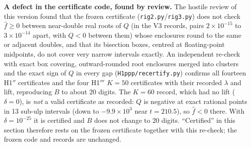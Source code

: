 \textbf{A defect in the certificate code, found by review.} The hostile review of this version found that the frozen
certificate (\texttt{rig2.py}/\texttt{rig3.py}) does not check $\hat f\ge0$ between near-double real roots of $Q$ (in the V3 records, pairs
$2\times10^{-15}$ to $3\times10^{-14}$ apart, with $Q<0$ between them) whose enclosures round to the same or adjacent
doubles, and that its bisection boxes, centred at floating-point midpoints, do not cover very narrow intervals exactly. An
independent re-check with exact box covering, outward-rounded root enclosures merged into clusters and the exact sign of $Q$ in
every gap (\texttt{H1ppp/recertify.py}) confirms all fourteen H1$''$ certificates and the four H1$'''$ $K=50$ certificates with
their recorded $\lambda$ and lift, reproducing $B$ to about 20 digits. The $K=60$ record, which had no lift ($\delta=0$), is
\emph{not} a valid certificate as recorded: $Q$ is negative at exact rational points in 13 sub-ulp intervals (down to
$-9.9\times10^{3}$ near $t=210.5$), so $\hat f<0$ there. With $\delta=10^{-25}$ it is certified and $B$ does not change to 20
digits. ``Certified'' in this section therefore rests on the frozen certificate together with this re-check; the frozen code and
records are unchanged.

